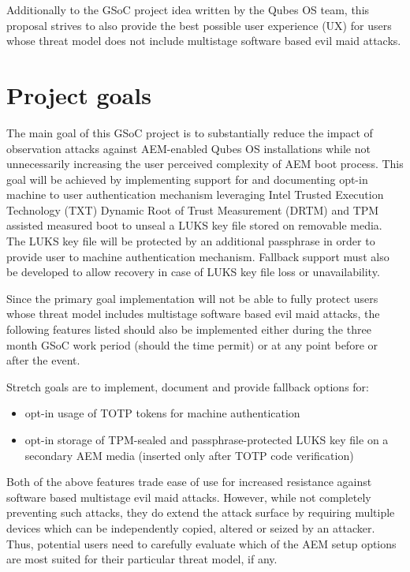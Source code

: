\documentclass[10pt,a4paper,twocolumn]{article}
\begin{document}
Additionally to the GSoC project idea \cite{gsoc-proj-ideas} written by the
Qubes OS team, this proposal strives to also provide the best possible user
experience (UX) for users whose threat model does not include multistage
software based evil maid attacks.


\section{Project goals}

The main goal of this GSoC project is to substantially reduce the impact of
observation attacks against AEM-enabled Qubes OS installations while not
unnecessarily increasing the user perceived complexity of AEM boot process.
This goal will be achieved by implementing support for and documenting opt-in
machine to user authentication mechanism leveraging Intel Trusted Execution
Technology (TXT) Dynamic Root of Trust Measurement (DRTM) and TPM assisted
measured boot to unseal a LUKS key file stored on removable media.  The LUKS
key file will be protected by an additional passphrase in order to provide user
to machine authentication mechanism. Fallback support must also be developed to
allow recovery in case of LUKS key file loss or unavailability.

Since the primary goal implementation will not be able to fully protect users
whose threat model includes multistage software based evil maid attacks, the
following features listed should also be implemented either during the three
month GSoC work period (should the time permit) or at any point before or after
the event.

Stretch goals are to implement, document and provide fallback options for:
\begin{itemize}
  \item opt-in usage of TOTP tokens for machine authentication
  \item opt-in storage of TPM-sealed and passphrase-protected LUKS key file on
    a secondary AEM media (inserted only after TOTP code verification)
\end{itemize}

Both of the above features trade ease of use for increased resistance against
software based multistage evil maid attacks. However, while not completely
preventing such attacks, they do extend the attack surface by requiring
multiple devices which can be independently copied, altered or seized by an
attacker. Thus, potential users need to carefully evaluate which of the AEM
setup options are most suited for their particular threat model, if any.
\end{document}
